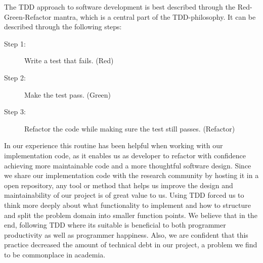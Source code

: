 The TDD approach to software development is best described through the
Red-Green-Refactor mantra, which is a central part of the
TDD-philosophy. It can be described through the following steps:

\begin{description}
    \item[Step 1:] Write a test that fails. (Red)
    \item[Step 2:] Make the test pass. (Green)
    \item[Step 3:] Refactor the code while making sure the test
        still passes. (Refactor)
\end{description}

In our experience this routine has been helpful when working
with our implementation code, as it enables us as developer to
refactor with confidence achieving more maintainable code and a
more thoughtful software design. Since we share our
implementation code with the research community by hosting it in
a open repository, any tool or method that helps us improve the
design and maintainability of our project is of great value to
us. Using TDD forced us to think more deeply about what
functionality to implement and how to structure and split the
problem domain into smaller function points. We believe that in
the end, following TDD where its suitable is beneficial to both
programmer productivity as well as programmer happiness. Also,
we are confident that this practice decreased the amount of
technical debt in our project, a problem we find to be commonplace in academia.



